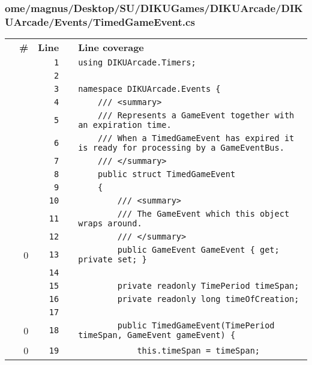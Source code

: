 \documentclass[a4paper,landscape,10pt]{article}
\begin{document}
\subsubsection{ome/magnus/Desktop/SU/DIKUGames/DIKUArcade/DIKUArcade/Events/TimedGameEvent.cs}
\begin{longtable}[l]{lrrll}
\textbf{} & \textbf{\#} & \textbf{Line} & \textbf{} & \textbf{Line coverage}\\
\cellcolor{gray} &  & \verb~1~ & & \verb~using DIKUArcade.Timers;~\\
\cellcolor{gray} &  & \verb~2~ & & \verb~~\\
\cellcolor{gray} &  & \verb~3~ & & \verb~namespace DIKUArcade.Events {~\\
\cellcolor{gray} &  & \verb~4~ & & \verb~    /// <summary>~\\
\cellcolor{gray} &  & \verb~5~ & & \verb~    /// Represents a GameEvent together with an expiration time.~\\
\cellcolor{gray} &  & \verb~6~ & & \verb~    /// When a TimedGameEvent has expired it is ready for processing by a GameEventBus.~\\
\cellcolor{gray} &  & \verb~7~ & & \verb~    /// </summary>~\\
\cellcolor{gray} &  & \verb~8~ & & \verb~    public struct TimedGameEvent~\\
\cellcolor{gray} &  & \verb~9~ & & \verb~    {~\\
\cellcolor{gray} &  & \verb~10~ & & \verb~        /// <summary>~\\
\cellcolor{gray} &  & \verb~11~ & & \verb~        /// The GameEvent which this object wraps around.~\\
\cellcolor{gray} &  & \verb~12~ & & \verb~        /// </summary>~\\
\cellcolor{red} & 0 & \verb~13~ & & \verb~        public GameEvent GameEvent { get; private set; }~\\
\cellcolor{gray} &  & \verb~14~ & & \verb~~\\
\cellcolor{gray} &  & \verb~15~ & & \verb~        private readonly TimePeriod timeSpan;~\\
\cellcolor{gray} &  & \verb~16~ & & \verb~        private readonly long timeOfCreation;~\\
\cellcolor{gray} &  & \verb~17~ & & \verb~~\\
\cellcolor{red} & 0 & \verb~18~ & & \verb~        public TimedGameEvent(TimePeriod timeSpan, GameEvent gameEvent) {~\\
\cellcolor{red} & 0 & \verb~19~ & & \verb~            this.timeSpan = timeSpan;~\\

\end{longtable}
\end{document}
